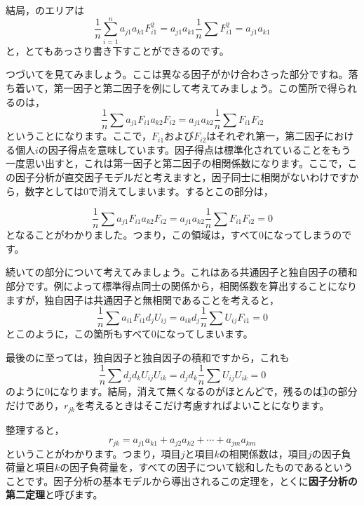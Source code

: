 \documentclass{ltjsbook}
\begin{document}
結局，のエリアは
\begin{equation}
	\frac{1}{n}\sum_{i=1}^{n}a_{j1}a_{k1}F_{i1}^2=a_{j1}a_{k1}\frac{1}{n}\sum F_{i1}^2=a_{j1}a_{k1}
\end{equation}
と，とてもあっさり書き下すことができるのです。

つづいてを見てみましょう。ここは異なる因子がかけ合わさった部分ですね。落ち着いて，第一因子と第二因子を例にして考えてみましょう。この箇所で得られるのは，
\begin{equation}
	\frac{1}{n}\sum a_{j1}F_{i1} a_{k2}F_{i2} = a_{j1}a_{k2}\frac{1}{n}\sum F_{i1}F_{i2}
\end{equation}
ということになります。ここで，$F_{i1}$および$F_{i2}$はそれぞれ第一，第二因子における個人$i$の因子得点を意味しています。因子得点は標準化されていることをもう一度思い出すと，これは第一因子と第二因子の相関係数になります。ここで，この因子分析が直交因子モデルだと考えますと，因子同士に相関がないわけですから，数字としては$0$で消えてしまいます。するとこの部分は，

\begin{equation}
	\frac{1}{n}\sum a_{j1}F_{i1} a_{k2}F_{i2} = a_{j1}a_{k2}\frac{1}{n}\sum F_{i1}F_{i2}=0
\end{equation}
となることがわかりました。つまり，この領域は，すべて$0$になってしまうのです。


続いての部分について考えてみましょう。これはある共通因子と独自因子の積和部分です。例によって標準得点同士の関係から，相関係数を算出することになりますが，独自因子は共通因子と無相関であることを考えると，
\begin{equation}
	\frac{1}{n}\sum a_{i1}F_{i1}d_{j}U_{ij}=a_{ik}d_{j} \frac{1}{n}\sum U_{ij}F_{i1} =0
\end{equation}
とこのように，この箇所もすべて$0$になってしまいます。

最後のに至っては，独自因子と独自因子の積和ですから，これも
\begin{equation}
	\frac{1}{n}\sum d_{j}d_{k}U_{ij}U_{ik}=d_{j}d_{k}\frac{1}{n}\sum U_{ij}U_{ik}=0
\end{equation}
のように$0$になります。結局，消えて無くなるのがほとんどで，残るのは\textcircled{1}の部分だけであり，$r_{jk}$を考えるときはそこだけ考慮すればよいことになります。

整理すると，
\begin{equation}
	r_{jk}=a_{j1}a_{k1}+a_{j2}a_{k2}+ \cdots +a_{jm}a_{km}
\end{equation}
ということがわかります。つまり，項目$j$と項目$k$の相関係数は，項目$j$の因子負荷量と項目$k$の因子負荷量を，すべての因子について総和したものであるということです。因子分析の基本モデルから導出されるこの定理を，とくに\textbf{因子分析の第二定理}と呼びます。
\end{document}
